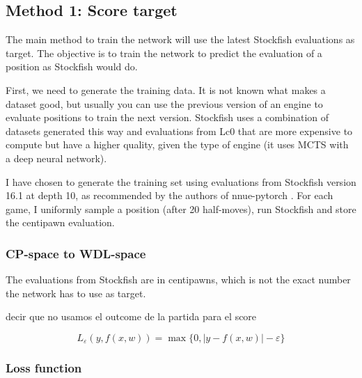 

\subsection{Method 1: Score target}

The main method to train the network will use the latest Stockfish evaluations as target. The objective is to train the network to predict the evaluation of a position as Stockfish would do.

First, we need to generate the training data. It is not known what makes a dataset good, but usually you can use the previous version of an engine to evaluate positions to train the next version. Stockfish uses a combination of datasets generated this way and evaluations from Lc0 that are more expensive to compute but have a higher quality, given the type of engine (it uses MCTS with a deep neural network).

I have chosen to generate the training set using evaluations from Stockfish version 16.1 at depth 10, as recommended by the authors of nnue-pytorch \cite{nnue-pytorch}. For each game, I uniformly sample a position (after 20 half-moves), run Stockfish and store the centipawn evaluation.

\setcounter{secnumdepth}{4}
\subsubsection{CP-space to WDL-space}

The evaluations from Stockfish are in centipawns, which is not the exact number the network has to use as target.


decir que no usamos el outcome de la partida para el score

\[
L_\varepsilon(y,f(x,w))=
\max\{0, |y-f(x,w)|-\varepsilon\}
\]


\subsubsection{Loss function}

